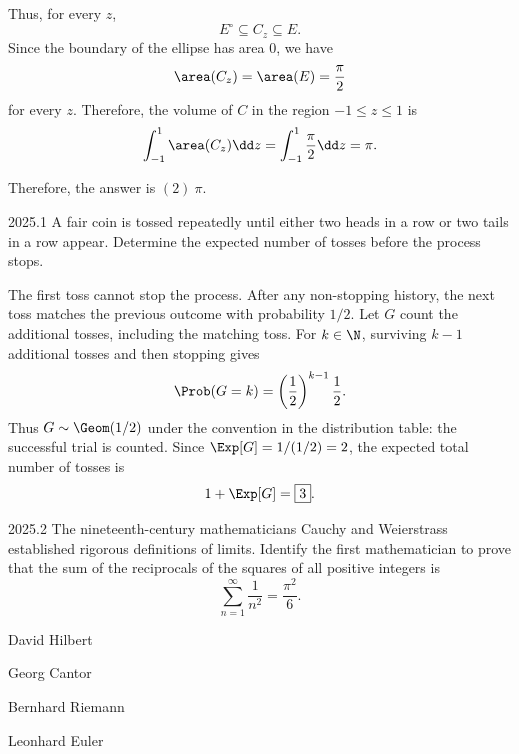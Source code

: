 \begin{solution}
        Thus, for every $z$,
        \[
            E^\circ\subseteq C_z\subseteq E.
        \]
        Since the boundary of the ellipse has area $0$, we have
        \[
            \area(C_z)=\area(E)=\frac{\pi}{2}
        \]
        for every $z$. Therefore, the volume of $C$ in the region $-1\leq z\leq 1$ is
        \[
            \int_{-1}^{1}\area(C_z)\dd z
            =
            \int_{-1}^{1}\frac{\pi}{2}\dd z
            =
            \pi.
        \]

        Therefore, the answer is $\boxed{(2)\ \pi}$.
    \end{solution}

    \begin{pastproblem}{2025.1}
        A fair coin is tossed repeatedly until either two heads in a row or two tails in a row
        appear. Determine the expected number of tosses before the process stops.
    \end{pastproblem}

    \begin{solution}
The first toss cannot stop the process. After any non-stopping history,
        the next toss matches the previous outcome with probability $1/2$.
        Let $G$ count the additional tosses, including the matching toss.
        For $k\in\N$, surviving $k-1$ additional tosses and then stopping gives
        \[
            \Prob(G=k)=\left(\frac12\right)^{k-1}\frac12.
        \]
        Thus $G\sim\Geom(1/2)$ under the convention in the distribution table:
        the successful trial is counted. Since $\Exp[G]=1/(1/2)=2$,
        the expected total number of tosses is
        \[
            1+\Exp[G]=\boxed{3}.
        \]
    \end{solution}

    \begin{pastproblem}{2025.2}
        The nineteenth-century mathematicians Cauchy and Weierstrass established rigorous
        definitions of limits. Identify the first mathematician to prove that the sum of the
        reciprocals of the squares of all positive integers is
        \[
            \sum_{n=1}^{\infty}\frac{1}{n^2}
            =
            \frac{\pi^2}{6}.
        \]
        \begin{problemchoices}
            \item David Hilbert
            \item Georg Cantor
            \item Bernhard Riemann
            \item Leonhard Euler
        \end{problemchoices}
    \end{pastproblem}

